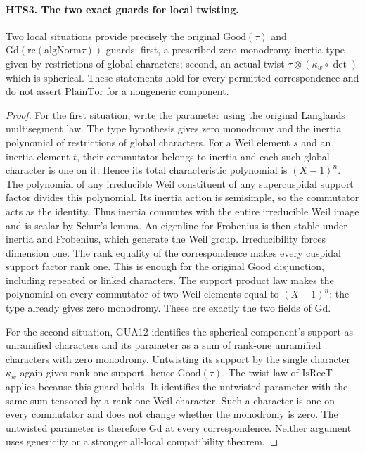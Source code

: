 \paragraph{HTS3. The two exact guards for local twisting.}
\label{claim:HTS3}
Two local situations provide precisely the original
$\mathrm{Good}(\tau)$ and $\mathrm{Gd}(\mathrm{rc}(\mathrm{algNorm}\tau))$
guards: first, a prescribed zero-monodromy inertia type given by
restrictions of global characters; second, an actual twist
$\tau\otimes(\kappa_w\circ\det)$ which is spherical.
These statements hold for every permitted correspondence and
do not assert $\mathrm{PlainTor}$ for a nongeneric component.
\begin{proof}
For the first situation, write the parameter using the original
Langlands multisegment law.  The type hypothesis gives zero
monodromy and the inertia polynomial of restrictions of global
characters.  For a Weil element $s$ and an inertia element $t$,
their commutator belongs to inertia and each such global character
is one on it.  Hence its total characteristic polynomial is
$(X-1)^n$.  The polynomial of any irreducible Weil constituent
of any supercuspidal support factor divides this polynomial.
Its inertia action is semisimple, so the commutator acts as the
identity.  Thus inertia commutes with the entire irreducible
Weil image and is scalar by Schur's lemma.  An eigenline for
Frobenius is then stable under inertia and Frobenius, which
generate the Weil group.  Irreducibility forces dimension one.
The rank equality of the correspondence makes every cuspidal
support factor rank one.  This is enough for the original
$\mathrm{Good}$ disjunction, including repeated or linked
characters.  The support product law makes the polynomial on
every commutator of two Weil elements equal to $(X-1)^n$;
the type already gives zero monodromy.  These are exactly
the two fields of $\mathrm{Gd}$.

For the second situation, GUA12 identifies the spherical
component's support as unramified characters and its parameter
as a sum of rank-one unramified characters with zero monodromy.
Untwisting its support by the single character $\kappa_w$
again gives rank-one support, hence $\mathrm{Good}(\tau)$.
The twist law of $\mathrm{IsRecT}$ applies because this guard
holds.  It identifies the untwisted parameter with the same
sum tensored by a rank-one Weil character.  Such a character
is one on every commutator and does not change whether the
monodromy is zero.  The untwisted parameter is therefore
$\mathrm{Gd}$ at every correspondence.  Neither argument
uses genericity or a stronger all-local compatibility theorem.
\end{proof}

